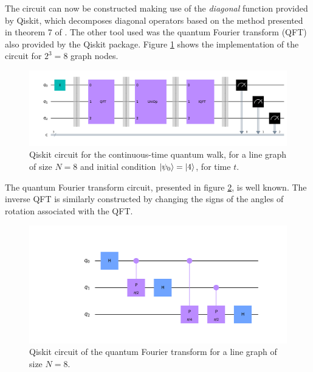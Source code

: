 \documentclass[../../dissertation.tex]{subfiles}
\begin{document}
The circuit can now be constructed making use of the \textit{diagonal} function
provided by Qiskit, which decomposes diagonal operators based on the method
presented in theorem 7 of \cite{shendel06}. The other tool used was the quantum
Fourier transform (QFT) also provided by the Qiskit package. Figure
\ref{fig:contQWCircuitQistkit} shows the implementation of the circuit for
$2^3=8$ graph nodes.
\begin{figure}[!h]
	\centering
	\includegraphics[scale=0.25]{img/Qiskit/ContQuantumWalk/Circuits/circContQW_N3_S1.png}
	\caption{Qiskit circuit for the continuous-time quantum walk, for a line graph of size $N=8$ and initial condition $\ket{\psi_0}=\ket{4}$, for time $t$.} 
	\label{fig:contQWCircuitQistkit}
\end{figure}\par

The quantum Fourier transform circuit, presented in figure
\ref{fig:qftCircuitQiskit}, is well known. The inverse QFT is similarly
constructed by changing the signs of the angles of rotation associated with the QFT.
\begin{figure}[!h]
	\centering
	\includegraphics[scale=0.28]{img/Qiskit/ContQuantumWalk/Circuits/circQft_N3_S1.png}
	\caption{Qiskit circuit of the quantum Fourier transform for a line graph of size $N=8$.} 
	\label{fig:qftCircuitQiskit}
\end{figure}\par
\end{document}
